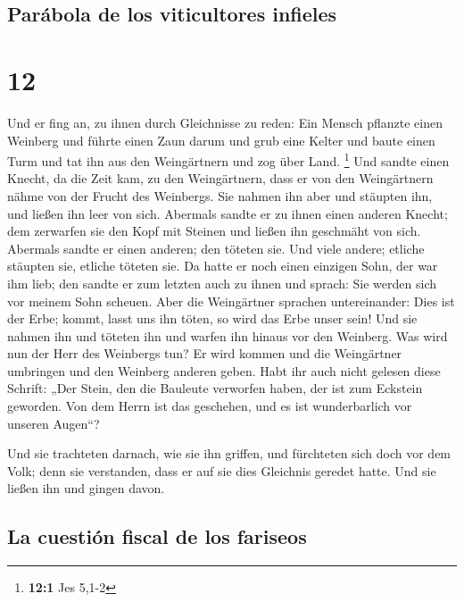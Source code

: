 \hypertarget{paruxe1bola-de-los-viticultores-infieles}{%
\subsection{Parábola de los viticultores
infieles}\label{paruxe1bola-de-los-viticultores-infieles}}

\hypertarget{section-11}{%
\section{12}\label{section-11}}

 Und er fing an, zu ihnen durch Gleichnisse zu reden: Ein
Mensch pflanzte einen Weinberg und führte einen Zaun darum und grub eine
Kelter und baute einen Turm und tat ihn aus den Weingärtnern und zog
über Land. \footnote{\textbf{12:1} Jes 5,1-2}  Und sandte
einen Knecht, da die Zeit kam, zu den Weingärtnern, dass er von den
Weingärtnern nähme von der Frucht des Weinbergs.  Sie
nahmen ihn aber und stäupten ihn, und ließen ihn leer von sich.
 Abermals sandte er zu ihnen einen anderen Knecht; dem
zerwarfen sie den Kopf mit Steinen und ließen ihn geschmäht von sich.
 Abermals sandte er einen anderen; den töteten sie. Und
viele andere; etliche stäupten sie, etliche töteten sie. 
Da hatte er noch einen einzigen Sohn, der war ihm lieb; den sandte er
zum letzten auch zu ihnen und sprach: Sie werden sich vor meinem Sohn
scheuen.  Aber die Weingärtner sprachen untereinander:
Dies ist der Erbe; kommt, lasst uns ihn töten, so wird das Erbe unser
sein!  Und sie nahmen ihn und töteten ihn und warfen ihn
hinaus vor den Weinberg.  Was wird nun der Herr des
Weinbergs tun? Er wird kommen und die Weingärtner umbringen und den
Weinberg anderen geben.  Habt ihr auch nicht gelesen
diese Schrift: „Der Stein, den die Bauleute verworfen haben, der ist zum
Eckstein geworden.  Von dem Herrn ist das geschehen, und
es ist wunderbarlich vor unseren Augen``?

 Und sie trachteten darnach, wie sie ihn griffen, und
fürchteten sich doch vor dem Volk; denn sie verstanden, dass er auf sie
dies Gleichnis geredet hatte. Und sie ließen ihn und gingen davon.

\hypertarget{la-cuestiuxf3n-fiscal-de-los-fariseos}{%
\subsection{La cuestión fiscal de los
fariseos}\label{la-cuestiuxf3n-fiscal-de-los-fariseos}}

